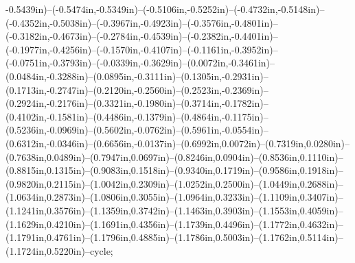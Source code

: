 -0.5439in)--(-0.5474in,-0.5349in)--(-0.5106in,-0.5252in)--(-0.4732in,-0.5148in)--(-0.4352in,-0.5038in)--(-0.3967in,-0.4923in)--(-0.3576in,-0.4801in)--(-0.3182in,-0.4673in)--(-0.2784in,-0.4539in)--(-0.2382in,-0.4401in)--(-0.1977in,-0.4256in)--(-0.1570in,-0.4107in)--(-0.1161in,-0.3952in)--(-0.0751in,-0.3793in)--(-0.0339in,-0.3629in)--(0.0072in,-0.3461in)--(0.0484in,-0.3288in)--(0.0895in,-0.3111in)--(0.1305in,-0.2931in)--(0.1713in,-0.2747in)--(0.2120in,-0.2560in)--(0.2523in,-0.2369in)--(0.2924in,-0.2176in)--(0.3321in,-0.1980in)--(0.3714in,-0.1782in)--(0.4102in,-0.1581in)--(0.4486in,-0.1379in)--(0.4864in,-0.1175in)--(0.5236in,-0.0969in)--(0.5602in,-0.0762in)--(0.5961in,-0.0554in)--(0.6312in,-0.0346in)--(0.6656in,-0.0137in)--(0.6992in,0.0072in)--(0.7319in,0.0280in)--(0.7638in,0.0489in)--(0.7947in,0.0697in)--(0.8246in,0.0904in)--(0.8536in,0.1110in)--(0.8815in,0.1315in)--(0.9083in,0.1518in)--(0.9340in,0.1719in)--(0.9586in,0.1918in)--(0.9820in,0.2115in)--(1.0042in,0.2309in)--(1.0252in,0.2500in)--(1.0449in,0.2688in)--(1.0634in,0.2873in)--(1.0806in,0.3055in)--(1.0964in,0.3233in)--(1.1109in,0.3407in)--(1.1241in,0.3576in)--(1.1359in,0.3742in)--(1.1463in,0.3903in)--(1.1553in,0.4059in)--(1.1629in,0.4210in)--(1.1691in,0.4356in)--(1.1739in,0.4496in)--(1.1772in,0.4632in)--(1.1791in,0.4761in)--(1.1796in,0.4885in)--(1.1786in,0.5003in)--(1.1762in,0.5114in)--(1.1724in,0.5220in)--cycle;
